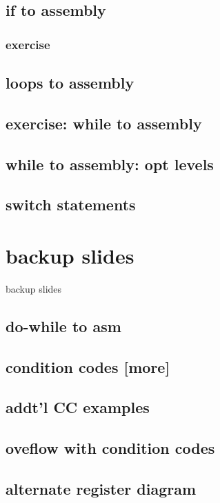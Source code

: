 \subsection{if to assembly}



\subsubsection{exercise}



\subsection{loops to assembly}



\subsection{exercise: while to assembly}



\subsection{while to assembly: opt levels}



\subsection{switch statements}



\section{backup slides}
\begin{frame}{backup slides}
\end{frame}

\subsection{do-while to asm}



\subsection{condition codes [more]}



\subsection{addt'l CC examples} %


\subsection{oveflow with condition codes}


\subsection{alternate register diagram}




